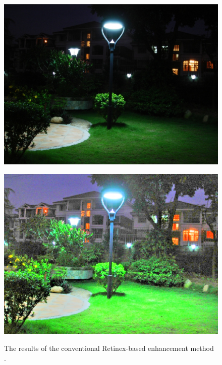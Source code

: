 \begin{figure}[tb]
\begin{minipage}[b]{0.5\hsize}
		\centering
		\includegraphics[height=0.6\hsize]{images/msr/input.eps}
		 \label{fig:msr/input}
	\end{minipage}
	\begin{minipage}[b]{0.5\hsize}
		\centering
		\includegraphics[height=0.6\hsize]{images/msr/reflectance.eps}
		 \label{fig:msr/reflectance}
	\end{minipage}
\caption{The results of the conventional Retinex-based enhancement method \cite{msr}.}
\label{fig:msr}
\end{figure}

